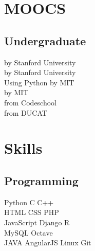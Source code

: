 \documentclass[]{deedy-resume-openfont}
\begin{document}
\begin{minipage}[t]{0.33\textwidth}

\section{MOOCS}
\subsection{Undergraduate}
 by Stanford University\\
 by Stanford University \\
 Using Python by MIT \\
 by MIT\\
 from Codeschool \\
 from DUCAT \\
\sectionsep



\section{Skills}
\subsection{Programming}
Python \textbullet{}   C \textbullet{} C++ \\
HTML \textbullet{} CSS \textbullet{} PHP \\ 
JavaScript \textbullet{} Django \textbullet{} R \textbullet{}\\ MySQL \textbullet{} Octave \\
JAVA \textbullet{} AngularJS \textbullet{} Linux \textbullet{} Git
\sectionsep

%
%

\end{minipage} 
\hfill
\end{document}
